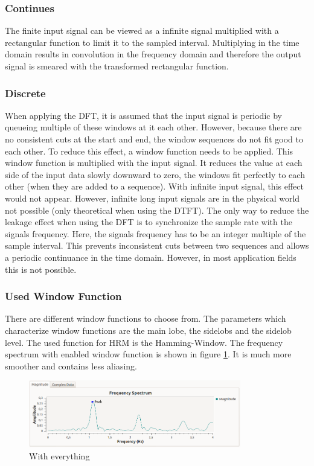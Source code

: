 \documentclass[notitlepage]{scrreprt}
\begin{document}
\subsubsection{Continues}
The finite input signal can be viewed as a infinite signal multiplied with a rectangular function to limit it to the sampled interval. Multiplying in the time domain results in convolution in the frequency domain and therefore the output signal is smeared with the transformed rectangular function.

\subsubsection{Discrete}
When applying the DFT, it is assumed that the input signal is periodic by queueing multiple of these windows at it each other. However, because there are no consistent cuts at the start and end, the window sequences do not fit good to each other. To reduce this effect, a window function needs to be applied. This window function is multiplied with the input signal. It reduces the value at each side of the input data slowly downward to zero, the windows fit perfectly to each other (when they are added to a sequence). With infinite input signal, this effect would not appear. However, infinite long input signals are in the physical world not possible (only theoretical when using the DTFT). The only way to reduce the leakage effect when using the DFT is to synchronize the sample rate with the  signals frequency. Here, the signals frequency has to be an integer multiple of the sample interval. This prevents inconsistent cuts between two sequences and allows a periodic continuance in the time domain. However, in most application fields this is not possible.\\

\subsubsection{Used Window Function}
There are different window functions to choose from. The parameters which characterize window functions are the main lobe, the sidelobs and the sidelob level. The used function for HRM is the Hamming-Window. The frequency spectrum with enabled window function is shown in figure \ref{fig:filter-window}. It is much more smoother and contains less aliasing.

\begin{figure}[H]
	\centering
	\includegraphics[width=350px]{images/withEverything.png}
	\caption{With everything}
	\label{fig:filter-window}
\end{figure}
\end{document}

